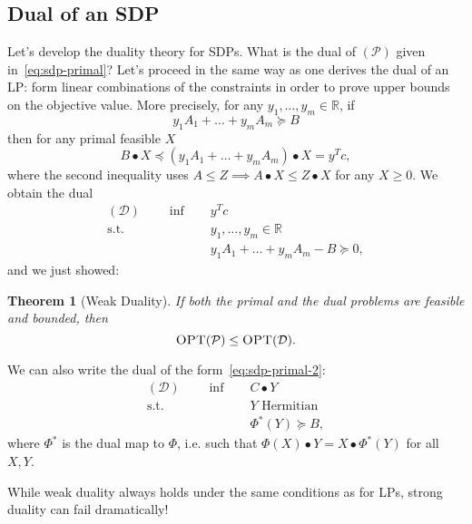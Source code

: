 \documentclass[11pt, letterpaper]{article}
\let\mathbb\relax
\let\mathbb\mathds
\newtheorem{theorem}{Theorem}[section]
\theoremstyle{remark}
\theoremstyle{definition}
\numberwithin{equation}{section}
\newcommand{\1}{\mathbb{1}}
\begin{document}
\subsection{Dual of an SDP}


Let's develop the duality theory for SDPs. What is the dual of $(\mathcal{P})$ given in~\eqref{eq:sdp-primal}? Let's proceed in the same way as one derives the dual of an LP: form linear combinations of the constraints in order to prove upper bounds on the objective value. More precisely, for any $y_1,\ldots, y_m\in\mathbb{R}$, if
$$
y_1A_1+\ldots+y_mA_m\succeq B
$$
then for any primal feasible $X$
$$
 B\bullet X \preceq (y_1A_1+\ldots+y_mA_m)\bullet X=y^Tc,
$$
where the second inequality uses $ A\leq Z \implies A\bullet X \leq Z \bullet X$ for any $X\geq 0$. We obtain the dual
\begin{align}
(\mathcal{D})\qquad\inf \quad & y^Tc \nonumber\\
\text{s.t.} \quad & y_1,\ldots, y_m \in\mathbb{R}\nonumber\\
& y_1A_1+\ldots + y_mA_m-B\succeq 0 \nonumber,
\end{align}
and we just showed:

\begin{theorem}[Weak Duality]
If both the primal and the dual problems are feasible and bounded, then
$$
\textsc{OPT}(\mathcal{P})\le \textsc{OPT}(\mathcal{D}).
$$
\end{theorem}

We can also write the dual of the form~\eqref {eq:sdp-primal-2}:
\begin{align}
(\mathcal{D})\qquad\inf \quad & C\bullet Y \nonumber\\
\text{s.t.} \quad & Y \text{ Hermitian}\nonumber\\
& \Phi^*(Y) \succeq B \nonumber,
\end{align}
where $\Phi^*$ is the dual map to $\Phi$, i.e. such that $\Phi(X)\bullet Y = X\bullet \Phi^*(Y)$ for all $X,Y$. 

While weak duality always holds under the same conditions as for LPs, strong duality can fail dramatically!
\end{document}
